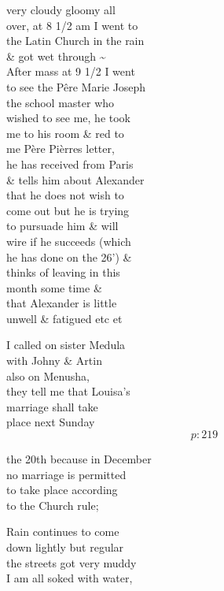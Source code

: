 \documentclass{report}
\begin{document}
	\par{
 	very cloudy gloomy all\ \\over, at 8 1/2 am I went to\ \\the Latin Church in the rain\ \\\& got wet through \~{}\ \\After mass at 9 1/2 I went\ \\to see the Pêre Marie Joseph\ \\the school master who\ \\wished to see me, he took\ \\me to his room \& red to\ \\me Père Pièrres letter,\ \\he has received from Paris\ \\\& tells him about Alexander\ \\that he does not wish to\ \\come out but he is trying\ \\to pursuade him \& will\ \\wire if he succeeds (which\ \\he has done on the 26’) \&\ \\thinks of leaving in this\ \\month some time \&\ \\that Alexander is little\ \\unwell \& fatigued etc et\ \\
	}

	\par{
 	I called on sister Medula\ \\with Johny \& Artin\ \\also on Menusha,\ \\they tell me that Louisa’s\ \\marriage shall take\ \\place next Sunday\ \\
  \[p: 219 \]

	}


	\par{
 	the 20th because in December\ \\no marriage is permitted\ \\to take place according\ \\to the Church rule;\ \\
	}

	\par{
 	Rain continues to come\ \\down lightly but regular\ \\the streets got very muddy\ \\I am all soked with water,\ \\
	}
\end{document}
